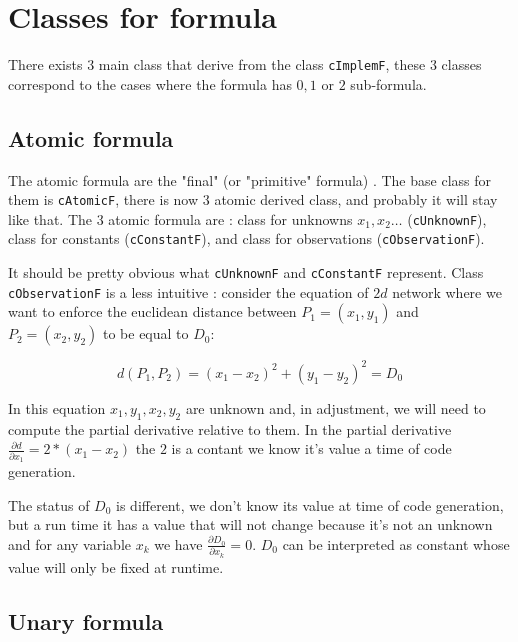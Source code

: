 \section{Classes for  formula}

There exists $3$ main class that derive from the class {\tt cImplemF}, these $3$ classes
correspond to the cases where the formula has $0,1$ or $2$ sub-formula.

\subsection{Atomic formula}

The atomic formula are the "final" (or "primitive" formula) .  The base
class for them is {\tt cAtomicF}, there is now $3$ atomic derived class, and
probably it will stay like that. The $3$ atomic formula are : 
class for unknowns $x_1,x_2\dots$ ({\tt cUnknownF}), class for constants ({\tt cConstantF}),
and class for observations ({\tt cObservationF}).

It should be pretty obvious what {\tt cUnknownF}  and {\tt cConstantF} represent.
Class {\tt cObservationF} is a less intuitive : consider the equation of 
$2d$ network  where we want to enforce the euclidean distance between $P_1=(x_1,y_1)$ and $P_2=(x_2,y_2)$
to be equal to $D_0$:

\begin{equation}
   d(P_1,P_2) = (x_1-x_2)^2 + (y_1-y_2)^2 = D_0
\end{equation}

In this equation $x_1,y_1,x_2,y_2$ are unknown and, in adjustment, we will need to compute 
the partial derivative relative to them. In the partial derivative $\frac{\partial d}{\partial x_1} = 2*(x_1-x_2)$
the $2$ is a contant we know it's value a time of code generation.

The status of $D_0$ is different, we don't know its value at time of code generation, but a run time
it has a value that will not change because it's not an unknown and for 
any variable $x_k$  we have $\frac{\partial D_0}{\partial x_k} =0$.
$D_0$ can be interpreted as constant whose value will only be fixed at runtime.



\subsection{Unary formula}

